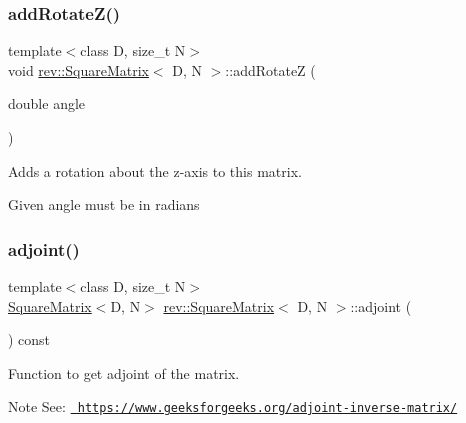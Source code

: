 \subsubsection{\texorpdfstring{addRotateZ()}{addRotateZ()}}
{\footnotesize\ttfamily template$<$class D, size\+\_\+t N$>$ \\
void \mbox{\hyperlink{classrev_1_1_square_matrix}{rev\+::\+Square\+Matrix}}$<$ D, N $>$\+::add\+RotateZ (\begin{DoxyParamCaption}\item[{double}]{angle }\end{DoxyParamCaption})\hspace{0.3cm}{\ttfamily [inline]}}



Adds a rotation about the z-\/axis to this matrix. 

Given angle must be in radians \mbox{\label{classrev_1_1_square_matrix_a4b1446f9e6a8c5de08026a487a8fa9fa}} 
\subsubsection{\texorpdfstring{adjoint()}{adjoint()}}
{\footnotesize\ttfamily template$<$class D, size\+\_\+t N$>$ \\
\mbox{\hyperlink{classrev_1_1_square_matrix}{Square\+Matrix}}$<$D, N$>$ \mbox{\hyperlink{classrev_1_1_square_matrix}{rev\+::\+Square\+Matrix}}$<$ D, N $>$\+::adjoint (\begin{DoxyParamCaption}{ }\end{DoxyParamCaption}) const\hspace{0.3cm}{\ttfamily [inline]}}



Function to get adjoint of the matrix. 

\begin{DoxyNote}{Note}
See\+: \href{https://www.geeksforgeeks.org/adjoint-inverse-matrix/}{\texttt{ https\+://www.\+geeksforgeeks.\+org/adjoint-\/inverse-\/matrix/}} 
\end{DoxyNote}
\mbox{\label{classrev_1_1_square_matrix_a1b8f1c482c9861c180f0b3d8559721c9}} 
